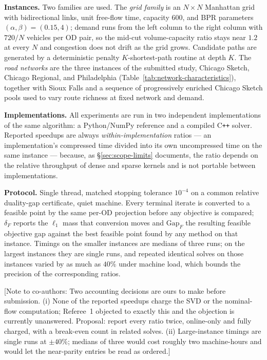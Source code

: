 \documentclass[11pt]{article}
\newcommand{\conote}[1]{{\color{red}\small\textsf{[Note to co-authors: #1]}}}
\begin{document}
\textbf{Instances.} Two families are used. The \emph{grid family} is an $N\times N$
Manhattan grid with bidirectional links, unit free-flow time, capacity $600$, and BPR
parameters $(\alpha,\beta)=(0.15,4)$; demand runs from the left column to the right column
with $720/N$ vehicles per OD pair, so the mid-cut volume-capacity ratio stays near $1.2$ at
every $N$ and congestion does not drift as the grid grows. Candidate paths are generated by
a deterministic penalty $K$-shortest-path routine at depth $K$. The \emph{road networks} are
the three instances of the submitted study, Chicago Sketch, Chicago Regional, and
Philadelphia (Table~\ref{tab:network-characteristics}), together with Sioux Falls and a
sequence of progressively enriched Chicago Sketch pools used to vary route richness at fixed
network and demand.

\textbf{Implementations.} All experiments are run in two independent implementations of the
same algorithm: a Python/NumPy reference and a compiled C\texttt{++} solver. Reported
speedups are always \emph{within-implementation} ratios --- an implementation's compressed
time divided into its own uncompressed time on the same instance --- because, as
\S\ref{sec:scope-limits} documents, the ratio depends on the relative throughput of dense and
sparse kernels and is not portable between implementations.

\textbf{Protocol.} Single thread, matched stopping tolerance $10^{-4}$ on a common relative
duality-gap certificate, quiet machine. Every terminal iterate is converted to a feasible
point by the same per-OD projection before any objective is compared; $\delta_F$ reports the
$\ell_1$ mass that conversion moves and $\mathrm{Gap}_F$ the resulting feasible objective
gap against the best feasible point found by any method on that instance. Timings on the
smaller instances are medians of three runs; on the largest instances they are single runs,
and repeated identical solves on those instances varied by as much as $40\%$ under machine
load, which bounds the precision of the corresponding ratios.

\conote{Two accounting decisions are ours to make before submission. (i) None of the reported
speedups charge the SVD or the nominal-flow computation; Referee~1 objected to exactly this
and the objection is currently unanswered. Proposal: report every ratio twice, online-only and
fully charged, with a break-even count in related solves. (ii) Large-instance timings are
single runs at $\pm40\%$; medians of three would cost roughly two machine-hours and would let
the near-parity entries be read as ordered.}
\end{document}
